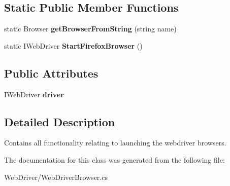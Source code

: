 \subsection*{Static Public Member Functions}
\begin{DoxyCompactItemize}
\item 
\hypertarget{class_proto_test_1_1_golem_1_1_web_driver_1_1_web_driver_browser_a23461345615e8444e1888c70d4310177}{static Browser {\bfseries get\-Browser\-From\-String} (string name)}\label{class_proto_test_1_1_golem_1_1_web_driver_1_1_web_driver_browser_a23461345615e8444e1888c70d4310177}

\item 
\hypertarget{class_proto_test_1_1_golem_1_1_web_driver_1_1_web_driver_browser_ad1602a5789b0150e5d6cb7d0ea608cc5}{static I\-Web\-Driver {\bfseries Start\-Firefox\-Browser} ()}\label{class_proto_test_1_1_golem_1_1_web_driver_1_1_web_driver_browser_ad1602a5789b0150e5d6cb7d0ea608cc5}

\end{DoxyCompactItemize}
\subsection*{Public Attributes}
\begin{DoxyCompactItemize}
\item 
\hypertarget{class_proto_test_1_1_golem_1_1_web_driver_1_1_web_driver_browser_af0273bb4ea24426b4a074923d2864b9b}{I\-Web\-Driver {\bfseries driver}}\label{class_proto_test_1_1_golem_1_1_web_driver_1_1_web_driver_browser_af0273bb4ea24426b4a074923d2864b9b}

\end{DoxyCompactItemize}


\subsection{Detailed Description}
Contains all functionality relating to launching the webdriver browsers. 



The documentation for this class was generated from the following file\-:\begin{DoxyCompactItemize}
\item 
Web\-Driver/Web\-Driver\-Browser.\-cs\end{DoxyCompactItemize}
